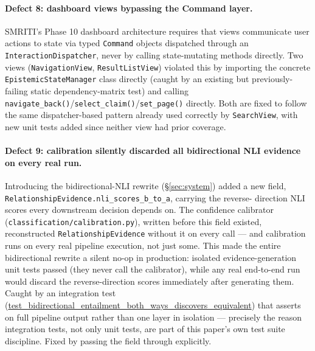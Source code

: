 \paragraph{Defect 8: dashboard views bypassing the Command layer.}
SMRITI's Phase 10 dashboard architecture requires that views communicate
user actions to state via typed \texttt{Command} objects dispatched
through an \texttt{InteractionDispatcher}, never by calling state-mutating
methods directly. Two views (\texttt{NavigationView},
\texttt{ResultListView}) violated this by importing the concrete
\texttt{EpistemicStateManager} class directly (caught by an existing but
previously-failing static dependency-matrix test) and calling
\texttt{navigate\_back()}/\texttt{select\_claim()}/\texttt{set\_page()}
directly. Both are fixed to follow the same dispatcher-based pattern
already used correctly by \texttt{SearchView}, with new unit tests added
since neither view had prior coverage.

\paragraph{Defect 9: calibration silently discarded all bidirectional NLI
evidence on every real run.} Introducing the bidirectional-NLI rewrite
(\S\ref{sec:system}) added a new field,
\texttt{RelationshipEvidence.nli\_scores\_b\_to\_a}, carrying the reverse-
direction NLI scores every downstream decision depends on. The confidence
calibrator (\texttt{classification/calibration.py}), written before this
field existed, reconstructed \texttt{RelationshipEvidence} without it on
every call --- and calibration runs on every real pipeline execution,
not just some. This made the entire bidirectional rewrite a silent no-op
in production: isolated evidence-generation unit tests passed (they never
call the calibrator), while any real end-to-end run would discard the
reverse-direction scores immediately after generating them. Caught by an
integration test
(\url{test_bidirectional_entailment_both_ways_discovers_equivalent})
that asserts on full pipeline output rather than
one layer in isolation --- precisely the reason integration tests, not
only unit tests, are part of this paper's own test suite discipline.
Fixed by passing the field through explicitly.

